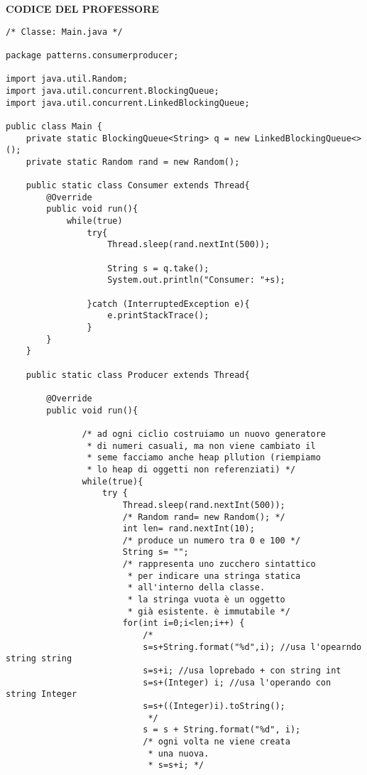 \noindent \textbf{CODICE DEL PROFESSORE} \newline
\begin{lstlisting}
/* Classe: Main.java */

package patterns.consumerproducer;

import java.util.Random;
import java.util.concurrent.BlockingQueue;
import java.util.concurrent.LinkedBlockingQueue;

public class Main {
    private static BlockingQueue<String> q = new LinkedBlockingQueue<>();
    private static Random rand = new Random();

    public static class Consumer extends Thread{
        @Override
        public void run(){
            while(true)
                try{
                    Thread.sleep(rand.nextInt(500));

                    String s = q.take();
                    System.out.println("Consumer: "+s);

                }catch (InterruptedException e){
                    e.printStackTrace();
                }
        }
    }

    public static class Producer extends Thread{

        @Override
        public void run(){

               /* ad ogni ciclio costruiamo un nuovo generatore
                * di numeri casuali, ma non viene cambiato il 
                * seme facciamo anche heap pllution (riempiamo
                * lo heap di oggetti non referenziati) */
               while(true){
                   try {
                       Thread.sleep(rand.nextInt(500));
                       /* Random rand= new Random(); */
                       int len= rand.nextInt(10); 
                       /* produce un numero tra 0 e 100 */
                       String s= ""; 
                       /* rappresenta uno zucchero sintattico
                        * per indicare una stringa statica
                        * all'interno della classe.
                        * la stringa vuota è un oggetto
                        * già esistente. è immutabile */
                       for(int i=0;i<len;i++) {
                           /*
                           s=s+String.format("%d",i); //usa l'opearndo string string
                           s=s+i; //usa loprebado + con string int
                           s=s+(Integer) i; //usa l'operando con string Integer
                           s=s+((Integer)i).toString();
                            */
                           s = s + String.format("%d", i);
                           /* ogni volta ne viene creata
                            * una nuova.
                            * s=s+i; */


\end{lstlisting}
